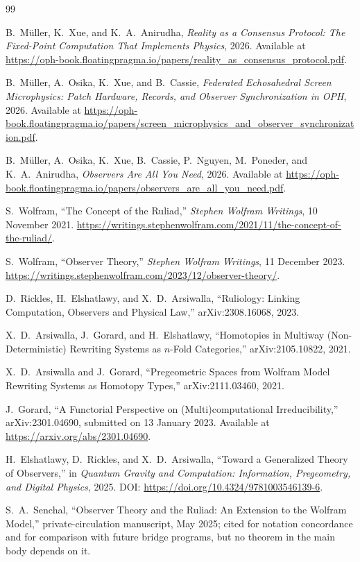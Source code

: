 \documentclass[11pt]{article}
\theoremstyle{remark}
\theoremstyle{plain}
\begin{document}
\begin{thebibliography}{99}

B.~M\"uller, K.~Xue, and K.~A.~Anirudha,
\emph{Reality as a Consensus Protocol: The Fixed-Point Computation That Implements Physics},
2026.
Available at \url{https://oph-book.floatingpragma.io/papers/reality_as_consensus_protocol.pdf}.

B.~M\"uller, A.~Osika, K.~Xue, and B.~Cassie,
\emph{Federated Echosahedral Screen Microphysics: Patch Hardware, Records, and Observer Synchronization in OPH},
2026.
Available at \url{https://oph-book.floatingpragma.io/papers/screen_microphysics_and_observer_synchronization.pdf}.

B.~M\"uller, A.~Osika, K.~Xue, B.~Cassie, P.~Nguyen, M.~Poneder, and K.~A.~Anirudha,
\emph{Observers Are All You Need},
2026.
Available at \url{https://oph-book.floatingpragma.io/papers/observers_are_all_you_need.pdf}.

S.~Wolfram,
``The Concept of the Ruliad,''
\emph{Stephen Wolfram Writings}, 10 November 2021.
\url{https://writings.stephenwolfram.com/2021/11/the-concept-of-the-ruliad/}.

S.~Wolfram,
``Observer Theory,''
\emph{Stephen Wolfram Writings}, 11 December 2023.
\url{https://writings.stephenwolfram.com/2023/12/observer-theory/}.

D.~Rickles, H.~Elshatlawy, and X.~D.~Arsiwalla,
``Ruliology: Linking Computation, Observers and Physical Law,''
arXiv:2308.16068, 2023.

X.~D.~Arsiwalla, J.~Gorard, and H.~Elshatlawy,
``Homotopies in Multiway (Non-Deterministic) Rewriting Systems as \(n\)-Fold Categories,''
arXiv:2105.10822, 2021.

X.~D.~Arsiwalla and J.~Gorard,
``Pregeometric Spaces from Wolfram Model Rewriting Systems as Homotopy Types,''
arXiv:2111.03460, 2021.

J.~Gorard,
``A Functorial Perspective on (Multi)computational Irreducibility,''
arXiv:2301.04690, submitted on 13 January 2023.
Available at \url{https://arxiv.org/abs/2301.04690}.

H.~Elshatlawy, D.~Rickles, and X.~D.~Arsiwalla,
``Toward a Generalized Theory of Observers,''
in \emph{Quantum Gravity and Computation: Information, Pregeometry, and Digital Physics},
2025.
DOI: \url{https://doi.org/10.4324/9781003546139-6}.

S.~A.~Senchal,
``Observer Theory and the Ruliad: An Extension to the Wolfram Model,''
private-circulation manuscript, May 2025; cited for notation concordance and for comparison with future bridge programs, but no theorem in the main body depends on it.

\end{thebibliography}
\end{document}
